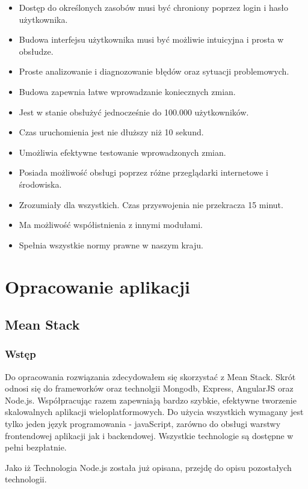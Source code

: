 \documentclass[12pt]{report}
\begin{document}
\begin{itemize}
\item Dostęp do określonych zasobów musi być chroniony poprzez login i hasło użytkownika.
\item Budowa interfejsu użytkownika musi być możliwie intuicyjna i prosta w obsłudze.
\item Proste analizowanie i diagnozowanie błędów oraz sytuacji problemowych.
\item Budowa zapewnia łatwe wprowadzanie koniecznych zmian.
\item Jest w stanie obsłużyć jednocześnie do 100.000 użytkowników.
\item Czas uruchomienia jest nie dłuższy niż 10 sekund.
\item Umożliwia efektywne testowanie wprowadzonych zmian.
\item Posiada możliwość obsługi poprzez różne przeglądarki internetowe i środowiska.
\item Zrozumiały dla wszystkich. Czas przyswojenia nie przekracza 15 minut.
\item Ma możliwość współistnienia z innymi modułami.
\item Spełnia wszystkie normy prawne w naszym kraju.
\end{itemize}

\chapter{Opracowanie aplikacji}

\section{Mean Stack}

\subsection{Wstęp}
Do opracowania rozwiązania zdecydowałem się skorzystać z Mean Stack. 
Skrót odnosi się do frameworków oraz technolgii Mongodb, Express, AngularJS oraz Node.js. 
Współpracując razem zapewniają bardzo szybkie, efektywne tworzenie skalowalnych aplikacji wieloplatformowych. 
Do użycia wszystkich wymagany jest tylko jeden język programowania - javaScript, zarówno do obsługi warstwy frontendowej aplikacji jak i backendowej. 
Wszystkie technologie są dostępne w pełni bezpłatnie. 

Jako iż Technologia Node.js została już opisana, przejdę do opisu pozostałych technologii.
\end{document}
